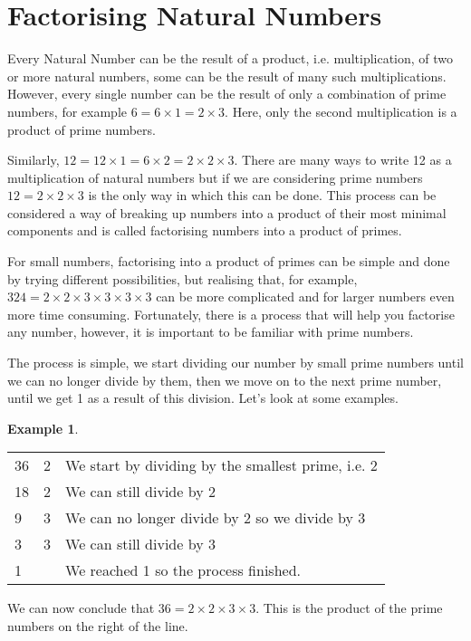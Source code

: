 \documentclass[11pt, oneside]{article}
\theoremstyle{definition}
\newtheorem{exmp}{Example}[section]
\begin{document}
\section{Factorising Natural Numbers}

Every Natural Number can be the result of a product, i.e. multiplication, of two or more natural numbers, some can be the result of many such multiplications. However, every single number can be the result of only a combination of prime numbers, for example $6 = 6\times 1 = 2 \times 3$. Here, only the second multiplication is a product of prime numbers. 

Similarly, $12 = 12 \times 1 = 6 \times 2 = 2\times 2 \times 3$. There are many ways to write 12 as a multiplication of natural numbers but if we are considering prime numbers $12 = 2\times 2\times 3$ is the only way in which this can be done. This process can be considered a way of breaking up numbers into a product of their most minimal components and is called factorising numbers into a product of primes. 

For small numbers, factorising into a product of primes can be simple and done by trying different possibilities, but realising that, for example, $324 = 2\times 2\times 3\times 3\times 3\times 3$ can be more complicated and for larger numbers even more time consuming. Fortunately, there is a process that will help you factorise any number, however, it is important to be familiar with prime numbers.

The process is simple, we start dividing our number by small prime numbers until we can no longer divide by them, then we move on to the next prime number, until we get 1 as a result of this division. Let's look at some examples.

\begin{exmp} \end{exmp}
\begin{tabular}{ p{0.5cm} | p{1.5cm}  p{10cm}}
36 & 2 & We start by dividing by the smallest prime, i.e. 2 \\
18 & 2 & We can still divide by 2  \\
9 & 3 & We can no longer divide by 2 so we divide by 3 \\
3 & 3 & We can still divide by 3 \\
1 &  & We reached 1 so the process finished.
\end{tabular}

We can now conclude that $36 = 2\times 2\times 3\times 3$. This is the product of the prime numbers on the right of the line.
\end{document}
